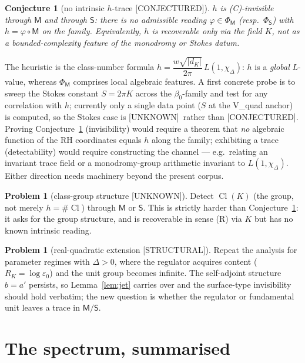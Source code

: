 \documentclass[11pt]{article}
\newtheorem{conjecture}[theorem]{Conjecture}
\theoremstyle{definition}
\newtheorem{problem}[theorem]{Problem}
\newcommand{\Cl}{\operatorname{Cl}}
\newcommand{\Mch}{\mathsf{M}}
\newcommand{\Stch}{\mathsf{S}}
\newcommand{\STRUCTURAL}{\textsf{[STRUCTURAL]}}
\newcommand{\CONJ}{\textsf{[CONJECTURED]}}
\newcommand{\UNK}{\textsf{[UNKNOWN]}}
\begin{document}
\begin{conjecture}[no intrinsic $h$-trace \CONJ]\label{conj:h}
$h$ is (C)-invisible through $\Mch$ and through $\Stch$: there is no admissible reading
$\varphi\in\Phi_\Mch$ (resp.\ $\Phi_\Stch$) with $h=\varphi\circ\Mch$ on the family.
Equivalently, $h$ is recoverable only via the field $K$, not as a bounded-complexity
feature of the monodromy or Stokes datum.
\end{conjecture}
The heuristic is the class-number formula
$h=\dfrac{w\sqrt{|d_K|}}{2\pi}\,L(1,\chi_\Delta)$: $h$ is a \emph{global} $L$-value,
whereas $\Phi_\Mch$ comprises local algebraic features. A first concrete probe is to
sweep the Stokes constant $S=2\pi K$ across the $\beta_0$-family and test for any
correlation with $h$; currently only a single data point ($S$ at the V\_quad anchor)
is computed, so the Stokes case is \UNK\ rather than \CONJ. Proving
Conjecture~\ref{conj:h} (invisibility) would require a theorem that \emph{no} algebraic
function of the RH coordinates equals $h$ along the family; exhibiting a trace
(detectability) would require constructing the channel --- e.g.\ relating an invariant
trace field or a monodromy-group arithmetic invariant to $L(1,\chi_\Delta)$. Either
direction needs machinery beyond the present corpus.

\begin{problem}[class-group structure \UNK]\label{prob:Cl}
Detect $\Cl(K)$ (the group, not merely $h=\#\Cl$) through $\Mch$ or $\Stch$. This is
strictly harder than Conjecture~\ref{conj:h}: it asks for the group structure, and is
recoverable in sense (R) via $K$ but has no known intrinsic reading.
\end{problem}

\begin{problem}[real-quadratic extension \STRUCTURAL]
Repeat the analysis for parameter regimes with $\Delta>0$, where the regulator
acquires content ($R_K=\log\varepsilon_0$) and the unit group becomes infinite. The
self-adjoint structure $b=a'$ persists, so Lemma~\ref{lem:jet} carries over and the
surface-type invisibility should hold verbatim; the new question is whether the
regulator or fundamental unit leaves a trace in $\Mch/\Stch$.
\end{problem}

\section{The spectrum, summarised}\label{sec:summary}
\end{document}
